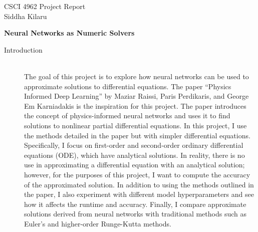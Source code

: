 \documentclass[12pt]{article}
\newcommand{\bgc}{\begin{center}}
\newcommand{\enc}{\end{center}}
\begin{document}
\noindent CSCI 4962 \hfill Project Report \\
Siddha Kilaru \\

\bgc
\textbf{Neural Networks as Numeric Solvers}
\enc

\begin{description}
    \item[Introduction] \hfill \\
    The goal of this project is to explore how neural networks can be used to
    approximate solutions to differential equations. The paper ``Physics
    Informed Deep Learning'' by Maziar Raissi, Paris Perdikaris, and George Em
    Karniadakis is the inspiration for this project. The paper introduces the
    concept of physics-informed neural networks and uses it to find solutions
    to nonlinear partial differential equations. In this project, I use the
    methods detailed in the paper but with simpler differential equations.
    Specifically, I focus on first-order and second-order ordinary differential
    equations (ODE), which have analytical solutions. In reality, there is no
    use in approximating a differential equation with an analytical solution;
    however, for the purposes of this project, I want to compute the accuracy
    of the approximated solution. In addition to using the methods outlined in
    the paper, I also experiment with different model hyperparameters and see
    how it affects the runtime and accuracy. Finally, I compare approximate
    solutions derived from neural networks with traditional methods such as
    Euler's and higher-order Runge-Kutta methods.


\end{description}
\end{document}
